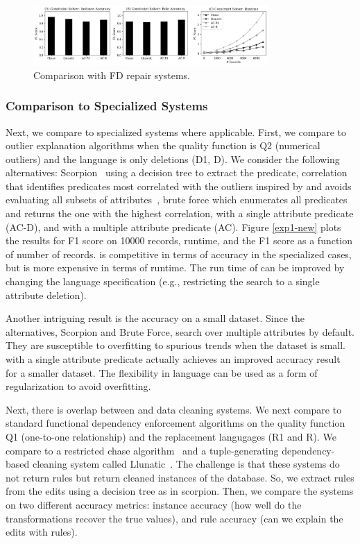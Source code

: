 \begin{figure}
    \centering
    \includegraphics[width=0.8\textwidth]{exp/exp2-new.png}
    \caption{\small Comparison with FD repair systems. \label{exp2-new}}
\end{figure}

\subsubsection{Comparison to Specialized Systems}
Next, we compare \sys to specialized systems where applicable.  First, we compare \sys to outlier explanation algorithms when the quality function is Q2 (numerical outliers) and the language is only deletions (D1, D). We consider the following alternatives: Scorpion~\cite{scorpion} using a decision tree to extract the predicate, correlation that identifies predicates most correlated with the outliers inspired by and avoids evaluating all subsets of attributes~\cite{bailis2016macrobase}, brute force which enumerates all predicates and returns the one with the highest correlation, \sys with a single attribute predicate (AC-D), and \sys with a multiple attribute predicate (AC). Figure \ref{exp1-new} plots the results for F1 score on 10000 records, runtime, and the F1 score as a function of number of records.
\sys is competitive in terms of accuracy in the specialized cases, but is more expensive in terms of runtime.
The run time of \sys can be improved by changing the language specification (e.g., restricting the search to a single attribute deletion).

Another intriguing result is the accuracy on a small dataset.
Since the alternatives, Scorpion and Brute Force, search over multiple attributes by default. They are susceptible to overfitting to spurious trends when the dataset is small.
\sys with a single attribute predicate actually achieves an improved accuracy result for a smaller dataset.
The flexibility in language can be used as a form of regularization to avoid overfitting.

Next, there is overlap between \sys and data cleaning systems. We next compare to standard functional dependency enforcement algorithms on the quality function Q1 (one-to-one relationship) and the replacement langugages (R1 and R). We compare \sys to a restricted chase algorithm~\cite{benedikt2017benchmarking} and a tuple-generating dependency-based cleaning system called Llunatic~\cite{DBLP:conf/sigmod/DallachiesaEEEIOT13}. The challenge is that these systems do not return rules but return cleaned instances of the database. So, we extract rules from the edits using a decision tree as in scorpion. Then, we compare the systems on two different accuracy metrics: instance accuracy (how well do the transformations recover the true values), and rule accuracy (can we explain the edits with rules). 

